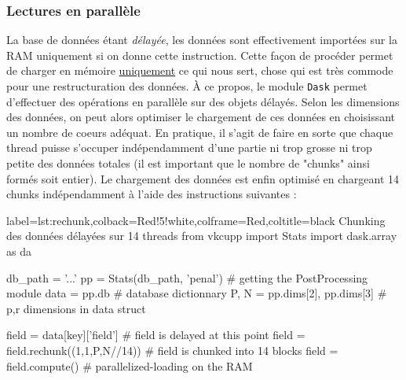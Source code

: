 \documentclass[13pt, a4paper]{extarticle}
\begin{document}
\subsubsection{Lectures en parallèle}
\noindent La base de données étant \emph{délayée}, les données
sont effectivement importées sur la RAM uniquement si on donne cette instruction.
Cette façon de procéder permet de charger en mémoire \ul{uniquement} ce qui nous sert, chose
qui est très commode pour une restructuration des données.
À ce propos, le module \texttt{Dask} permet d'effectuer des opérations en parallèle
sur des objets délayés. Selon les dimensions des données, on peut alors optimiser
le chargement de ces données en choisissant un nombre de coeurs adéquat. En pratique, 
il s'agit de faire en sorte que chaque thread puisse s'occuper indépendamment
d'une partie ni trop grosse ni trop petite des données totales (il est important 
que le nombre de "chunks" ainsi
formés soit entier). 
Le chargement des données est enfin optimisé en chargeant 14 chunks indépendamment
à l'aide des instructions suivantes :
\vspace{.2cm}

\noindent\begin{pythoncode}{label=lst:rechunk,colback=Red!5!white,colframe=Red,coltitle=black}
  {Chunking des données délayées sur 14 threads}
  from vkcupp import Stats
  import dask.array as da

  db_path = '...'
  pp = Stats(db_path, 'penal')         # getting the PostProcessing module
  data = pp.db                         # database dictionnary
  P, N = pp.dims[2], pp.dims[3]        # p,r dimensions in data struct

  field = data[key]['field']           # field is delayed at this point
  field = field.rechunk((1,1,P,N//14)) # field is chunked into 14 blocks
  field = field.compute()              # parallelized-loading on the RAM
\end{pythoncode}
\end{document}
